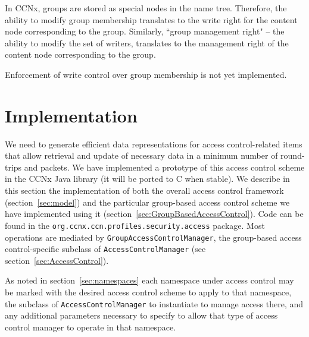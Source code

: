 In CCNx, groups are stored as special nodes in the name
tree. Therefore, the ability to modify group membership translates to
the write right for the content node corresponding to the
group. Similarly, ``group management right" -- the ability to modify
the set of writers, translates to the management right of the content
node corresponding to the group.

Enforcement of write control over group membership is not yet implemented. 

\section{Implementation}
\label{sec:implementation}
We need to generate efficient data representations for access
control-related items that allow retrieval and update of necessary
data in a minimum number of round-trips and packets. We have
implemented a prototype of this access control scheme in the CCNx Java
library (it will be ported to C when stable). We describe in this
section the implementation of both the overall access control
framework (section~\ref{sec:model}) and the particular group-based
access control scheme we have implemented using it
(section~\ref{sec:GroupBasedAccessControl}). Code can be found in the
{\tt org.ccnx.ccn.profiles.security.access} package. Most operations
are mediated by {\tt GroupAccessControlManager}, the group-based
access control-specific subclass of {\tt AccessControlManager} (see
section~\ref{sec:AccessControl}).

As noted in section~\ref{sec:namespaces} each namespace under access
control may be marked with the desired access control scheme to apply
to that namespace, the subclass of {\tt AccessControlManager} to
instantiate to manage access there, and any additional parameters
necessary to specify to allow that type of access control manager to
operate in that namespace.

